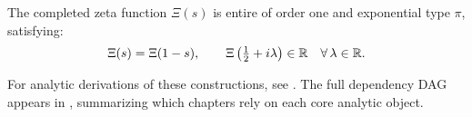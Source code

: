 \medskip

\noindent
The completed zeta function \( \Xi(s) \) is entire of order one and exponential type \( \pi \), satisfying:
\[
\Xi(s) = \Xi(1 - s), \qquad
\Xi\left( \tfrac{1}{2} + i\lambda \right) \in \mathbb{R} \quad \forall\, \lambda \in \mathbb{R}.
\]

\medskip

\noindent
For analytic derivations of these constructions, see . The full dependency DAG appears in , summarizing which chapters rely on each core analytic object.
